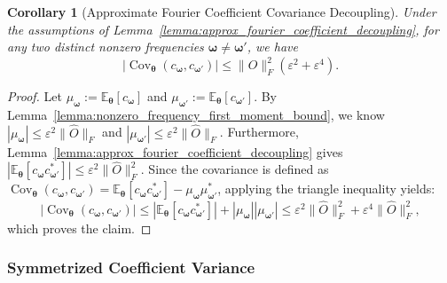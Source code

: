 \documentclass[%
 reprint,
 amsmath,amssymb,
 aps,
 pra,
]{revtex4-2}
\newtheorem{corollary}[theorem]{Corollary}
\theoremstyle{definition}
\begin{document}
\begin{corollary}[Approximate Fourier Coefficient Covariance Decoupling]
\label{cor:approx_fourier_coefficient_covariance_decoupling}
Under the assumptions of Lemma~\ref{lemma:approx_fourier_coefficient_decoupling}, for any two distinct nonzero frequencies $\bm{\omega}\neq\bm{\omega}'$, we have
\begin{equation}
\left| \operatorname{Cov}_{\bm{\theta}} \left( c_{\bm{\omega}},c_{\bm{\omega}'} \right) \right|
\leq
\|\hat O\|_F^2 \left( \varepsilon^2+\varepsilon^4 \right).
\end{equation}
\end{corollary}

\begin{proof}
Let $\mu_{\bm{\omega}} := \mathbb{E}_{\bm{\theta}} [ c_{\bm{\omega}} ]$ and $\mu_{\bm{\omega}'} := \mathbb{E}_{\bm{\theta}} [ c_{\bm{\omega}'} ]$. By Lemma~\ref{lemma:nonzero_frequency_first_moment_bound}, we know $|\mu_{\bm{\omega}}| \leq \varepsilon^2\|\hat O\|_F$ and $|\mu_{\bm{\omega}'}| \leq \varepsilon^2\|\hat O\|_F$. Furthermore, Lemma~\ref{lemma:approx_fourier_coefficient_decoupling} gives $\left| \mathbb{E}_{\bm{\theta}} [ c_{\bm{\omega}}c_{\bm{\omega}'}^* ] \right| \leq \varepsilon^2\|\hat O\|_F^2$. Since the covariance is defined as $\operatorname{Cov}_{\bm{\theta}} ( c_{\bm{\omega}},c_{\bm{\omega}'} ) = \mathbb{E}_{\bm{\theta}} [ c_{\bm{\omega}}c_{\bm{\omega}'}^* ] - \mu_{\bm{\omega}}\mu_{\bm{\omega}'}^*$, applying the triangle inequality yields:
\begin{equation}
\left| \operatorname{Cov}_{\bm{\theta}} ( c_{\bm{\omega}},c_{\bm{\omega}'} ) \right|
\leq
\left| \mathbb{E}_{\bm{\theta}} [ c_{\bm{\omega}}c_{\bm{\omega}'}^* ] \right| + |\mu_{\bm{\omega}}| |\mu_{\bm{\omega}'}|
\leq
\varepsilon^2\|\hat O\|_F^2 + \varepsilon^4\|\hat O\|_F^2,
\end{equation}
which proves the claim.
\end{proof}


\subsubsection{Symmetrized Coefficient Variance}
\label{app:tight_symmetrized_variance}
\end{document}

